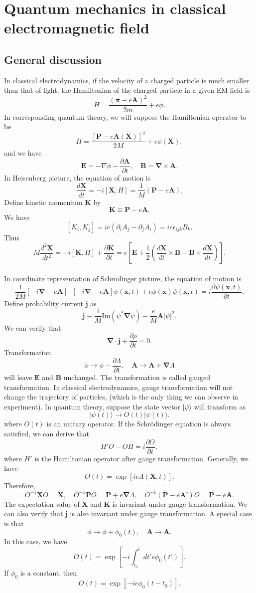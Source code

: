 \section{Quantum mechanics in classical electromagnetic field}
\subsection{General discussion}
In classical electrodynamics, if the velocity of a charged particle is much smaller than that of light, the Hamiltonian of the charged particle in a given EM field is
\[H = \frac{(\bm{\pi}-e\bm{A})^2}{2m} + e\phi.\]
In corresponding quantum theory, we will suppose the Hamiltonian operator to be
\[H = \frac{[\bm{P}-e\bm{A}(\bm{X})]^2}{2M} + e\phi(\bm{X}),\]
and we have
\[\bm{E} = -\nabla\phi - \frac{\partial \bm{A}}{\partial t} , \quad \bm{B} = \bm{\nabla}\times\bm{A}.\]
In Heisenberg picture, the equation of motion is
\[\frac{d\bm{X}}{dt} = -i[\bm{X},H] = \frac{1}{M}(\bm{P}-e\bm{A}).\]
Define kinetic momentum $\bm{K}$ by
\[\bm{K} \equiv \bm{P}-e\bm{A}.\]
We have
\[[K_i,K_j] = ie(\partial_i A_j-\partial_j A_i) = ie\epsilon_{ijk}B_k.\]
Thus
\[M \frac{d^2\bm{X}}{dt^2} = -i[\bm{K},H] + \frac{\partial \bm{K}}{\partial t} = e \left[ \bm{E}+ \frac{1}{2} \left( \frac{d\bm{X}}{dt} \times \bm{B} - \bm{B}\times\frac{d\bm{X}}{dt} \right) \right].\]
\\
In coordinate representation of Schrödinger picture, the equation of motion is
\[\frac{1}{2M} \left[ -i\bm{\nabla}-e\bm{A} \right] \cdot \left[ -i\bm{\nabla}-e\bm{A} \right] \psi(\bm{x},t) + e\phi(\bm{x})\psi(\bm{x},t) = i \frac{\partial \psi(\bm{x},t)}{\partial t}.\]
Define probability current $\bm{j}$ as
\[\bm{j} \equiv \frac{1}{M} \mathrm{Im}(\psi^{*}\bm{\nabla}\psi) - \frac{e}{M}\bm{A}|\psi|^2.\]
We can verify that
\[\bm{\nabla}\cdot\bm{j} + \frac{\partial \rho}{\partial t} = 0.\]
Transformation
\[\phi \to \phi - \frac{\partial \Lambda}{\partial t} , \quad \bm{A} \to \bm{A} + \bm{\nabla}\Lambda\]
will leave $\bm{E}$ and $\bm{B}$ unchanged. The transformation is called gauged transformation. In classical electrodynamics, gauge transformation will not change the trajectory of particles, (which is the only thing we can observe in experiment). In quantum theory, suppose the state vector $|\psi\rangle$ will transform as 
\[|\psi(t)\rangle \to O(t)|\psi(t)\rangle.\]
where $O(t)$ is an unitary operator. If the Schrödinger equation is always satisfied, we can derive that
\[H'O - OH = i\frac{\partial O}{\partial t},\]
where $H'$ is the Hamiltonian operator after gauge transformation. 
Generally, we have
\[O(t) = \exp \left[ ie\Lambda(\bm{X},t)\right].\]
Therefore,
\[O^{-1} \bm{X} O = \bm{X} , \quad O^{-1} \bm{P} O = \bm{P} + e\bm{\nabla}\Lambda , \quad O^{-1}(\bm{P}-e\bm{A}')O = \bm{P} - e\bm{A}.\]
The expectation value of $\bm{X}$ and $\bm{K}$ is invariant under gauge transformation. 
We can also verify that $\bm{j}$ is also invariant under gauge transformation.
A special case is that
\[\phi \to \phi+\phi_0(t) , \quad \bm{A} \to \bm{A}.\]
In this case, we have
\[O(t) = \exp \left[ -i \int_{t_0}^{t} dt' e\phi_0(t') \right].\]
If $\phi_0$ is a constant, then
\[O(t) = \exp \left[ -ie\phi_0(t-t_0) \right].\]

